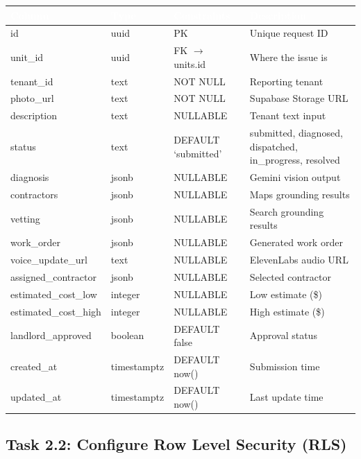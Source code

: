 \documentclass[11pt, a4paper]{article}
\begin{document}
\begin{tabularx}{\textwidth}{|l|l|l|X|}
\hline
\rowcolor{primary}
\textcolor{white}{\textbf{Column}} & \textcolor{white}{\textbf{Type}} & \textcolor{white}{\textbf{Constraints}} & \textcolor{white}{\textbf{Description}} \\
\hline
id & uuid & PK & Unique request ID \\
\hline
unit\_id & uuid & FK $\rightarrow$ units.id & Where the issue is \\
\hline
tenant\_id & text & NOT NULL & Reporting tenant \\
\hline
photo\_url & text & NOT NULL & Supabase Storage URL \\
\hline
description & text & NULLABLE & Tenant text input \\
\hline
status & text & DEFAULT `submitted' & submitted, diagnosed, dispatched, in\_progress, resolved \\
\hline
diagnosis & jsonb & NULLABLE & Gemini vision output \\
\hline
contractors & jsonb & NULLABLE & Maps grounding results \\
\hline
vetting & jsonb & NULLABLE & Search grounding results \\
\hline
work\_order & jsonb & NULLABLE & Generated work order \\
\hline
voice\_update\_url & text & NULLABLE & ElevenLabs audio URL \\
\hline
assigned\_contractor & jsonb & NULLABLE & Selected contractor \\
\hline
estimated\_cost\_low & integer & NULLABLE & Low estimate (\$) \\
\hline
estimated\_cost\_high & integer & NULLABLE & High estimate (\$) \\
\hline
landlord\_approved & boolean & DEFAULT false & Approval status \\
\hline
created\_at & timestamptz & DEFAULT now() & Submission time \\
\hline
updated\_at & timestamptz & DEFAULT now() & Last update time \\
\hline
\end{tabularx}

\vspace{1em}

\subsection{Task 2.2: Configure Row Level Security (RLS)}
\end{document}
